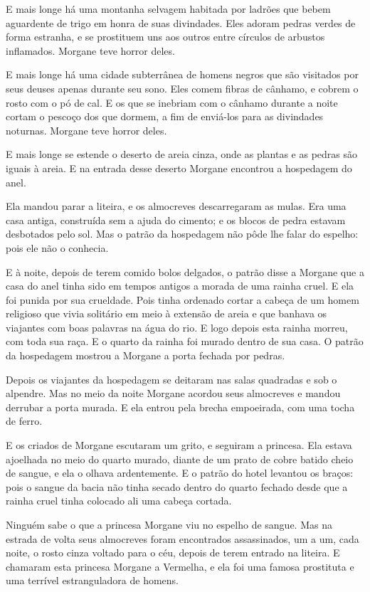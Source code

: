 E mais longe há uma montanha selvagem habitada por ladrões que bebem
aguardente de trigo em honra de suas divindades. Eles adoram pedras verdes
de forma estranha, e se prostituem uns aos outros entre círculos de
arbustos inflamados. Morgane teve horror deles.

E mais longe há uma cidade subterrânea de homens negros que são
visitados por seus deuses apenas durante seu sono. Eles comem fibras de
cânhamo, e cobrem o rosto com o pó de cal. E os que se inebriam com o
cânhamo durante a noite cortam o pescoço dos que dormem, a fim de
enviá-los para as divindades noturnas. Morgane teve horror deles.

E mais longe se estende o deserto de areia cinza, onde as plantas e as
pedras são iguais à areia. E na entrada desse deserto Morgane encontrou a
hospedagem do anel.

Ela mandou parar a liteira, e os almocreves descarregaram as mulas. Era
uma casa antiga, construída sem a ajuda do cimento; e os blocos de pedra
estavam desbotados pelo sol. Mas o patrão da hospedagem não pôde lhe falar
do espelho: pois ele não o conhecia.

E à noite, depois de terem comido bolos delgados, o patrão disse a
Morgane que a casa do anel tinha sido em tempos antigos a morada de uma
rainha cruel. E ela foi punida por sua crueldade. Pois tinha ordenado
cortar a cabeça de um homem religioso que vivia solitário em meio à extensão
de areia e que banhava os viajantes com boas palavras na água do rio. E
logo depois esta rainha morreu, com toda sua raça. E o quarto da rainha
foi murado dentro de sua casa. O patrão da hospedagem mostrou a Morgane a
porta fechada por pedras.

Depois os viajantes da hospedagem se deitaram nas salas quadradas e sob
o alpendre. Mas no meio da noite Morgane acordou seus almocreves e mandou
derrubar a porta murada. E ela entrou pela brecha empoeirada, com uma
tocha de ferro.

E os criados de Morgane escutaram um grito, e seguiram a princesa. Ela
estava ajoelhada no meio do quarto murado, diante de um prato de cobre
batido cheio de sangue, e ela o olhava ardentemente. E o patrão do hotel
levantou os braços: pois o sangue da bacia não tinha secado dentro do
quarto fechado desde que a rainha cruel tinha colocado ali uma cabeça
cortada.

Ninguém sabe o que a princesa Morgane viu no espelho de sangue. Mas na
estrada de volta seus almocreves foram encontrados assassinados, um a um,
cada noite, o rosto cinza voltado para o céu, depois de terem entrado na
liteira. E chamaram esta princesa Morgane a Vermelha, e ela foi uma famosa
prostituta e uma terrível estranguladora de homens.

